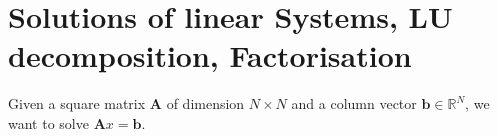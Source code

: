 \chapter{Solutions of linear Systems, LU decomposition, Factorisation} %
\label{cha:solutions_of_linear_systems_lu_decomposition_factorisation}

Given a square matrix $\mathbf{A}$ of dimension $N \times N$ and a column vector 
$\mathbf{b} \in \mathbb{R}^N$, we want to solve $\mathbf{A}x = \mathbf{b}$.



